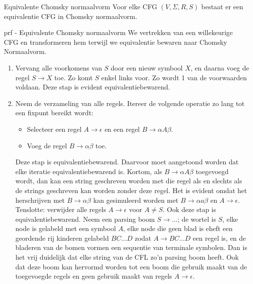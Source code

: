 \begin{lem}{Equivalente Chomsky normaalvorm}
    Voor elke CFG $(V, \Sigma, R, S)$ bestaat er een equivalentie CFG in Chomsky normaalvorm.
\end{lem}

\newpage

\begin{prf}{prf - Equivalente Chomsky normaalvorm}
    We vertrekken van een willekeurige CFG en transformeren hem terwijl we equivalentie bewaren naar Chomsky Normaalvorm.
    \begin{enumerate}
        \item 
            Vervang alle voorkomens van $S$ door een nieuw symbool $X$, en daarna voeg de regel $S \to X$ toe. Zo komt $S$ enkel links voor.
            Zo wordt 1 van de voorwaarden voldaan. Deze stap is evident equivalentiebewarend.
        \item 
            Neem de verzameling van alle regels. Itereer de volgende operatie zo lang tot een fixpunt bereikt wordt:
            \begin{itemize}
                \item Selecteer een regel $A \to \epsilon$ en een regel $B \to \alpha A \beta$.
                \item Voeg de regel $B \to \alpha\beta$ toe.
            \end{itemize}
            Deze stap is equivalentiebewarend. Daarvoor moet aangetoond worden dat elke iteratie equivalentiebewarend is. Kortom,
            als $B \to \alpha A \beta$ toegevoegd wordt, dan kan een string geschreven worden met die regel als en slechts als de strings geschreven
            kan worden zonder deze regel. Het is evident omdat het herschrijven met $B \to \alpha\beta$ kan gesimuleerd worden met $B \to \alpha a \beta$ en $A \to \epsilon$.
            Tenslotte: verwijder alle regels $A \to \epsilon$ voor $A \neq S$. Ook deze stap is equivalentiebewarend. Neem een parsing boom
            $S \to \ldots$; de wortel is $S$, elke node is gelabeld met een symbool $A$, elke node die geen blad is eheft een geordende rij kinderen
            gelabeld $BC \ldots D$ zodat $A \to BC \ldots D$ een regel is, en de bladeren van de bomen vormen een sequentie van terminale symbolen. 
            Dan is het vrij duidelijk dat elke string van de CFL zo'n parsing boom heeft. Ook dat deze boom kan hervormd worden tot een boom
            die gebruik maakt van de toegevoegde regels en geen gebruik maakt van regels $A \to \epsilon$.

\end{enumerate}
\end{prf}
